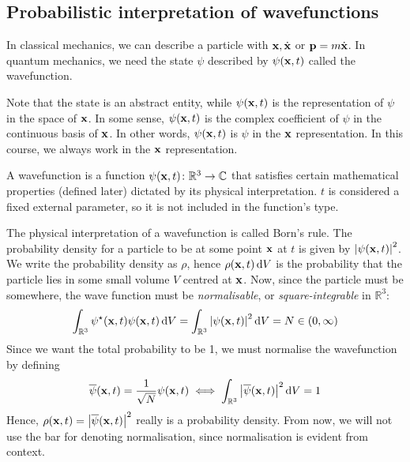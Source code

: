 \subsection{Probabilistic interpretation of wavefunctions}
In classical mechanics, we can describe a particle with \( \vb x, \dot{\vb x} \) or \( \vb p = m \dot{\vb x} \).
In quantum mechanics, we need the state \( \psi \) described by \( \psi(\vb x, t) \) called the wavefunction.
\begin{remark}
	Note that the state is an abstract entity, while \( \psi(\vb x, t) \) is the representation of \( \psi \) in the space of \( \vb x \).
	In some sense, \( \psi(\vb x, t) \) is the complex coefficient of \( \psi \) in the continuous basis of \( \vb x \).
	In other words, \( \psi(\vb x, t) \) is \( \psi \) in the \( \vb x \) representation.
	In this course, we always work in the \( \vb x \) representation.
\end{remark}
\begin{definition}
	A wavefunction is a function \( \psi(\vb x, t) \colon \mathbb R^3 \to \mathbb C \) that satisfies certain mathematical properties (defined later) dictated by its physical interpretation.
	\( t \) is considered a fixed external parameter, so it is not included in the function's type.
\end{definition}
The physical interpretation of a wavefunction is called Born's rule.
The probability density for a particle to be at some point \( \vb x \) at \( t \) is given by \( \abs{\psi(\vb x, t)}^2 \).
We write the probability density as \( \rho \), hence \( \rho(\vb x, t) \dd{V} \) is the probability that the particle lies in some small volume \( V \) centred at \( \vb x \).
Now, since the particle must be somewhere, the wave function must be \textit{normalisable}, or \textit{square-integrable} in \( \mathbb R^3 \):
\[
	\int_{\mathbb R^3} \psi^\star(\vb x, t) \psi(\vb x, t) \dd{V} = \int_{\mathbb R^3} \abs{\psi(\vb x, t)}^2 \dd{V} = N \in (0, \infty)
\]
Since we want the total probability to be 1, we must normalise the wavefunction by defining
\[
	\overline{\psi}(\vb x, t) = \frac{1}{\sqrt{N}} \psi(\vb x, t) \iff \int_{\mathbb R^3} \abs{\overline{\psi}(\vb x, t)}^2 \dd{V} = 1
\]
Hence, \( \rho(\vb x,t) = \abs{\overline{\psi}(\vb x,t)}^2 \) really is a probability density.
From now, we will not use the bar for denoting normalisation, since normalisation is evident from context.

